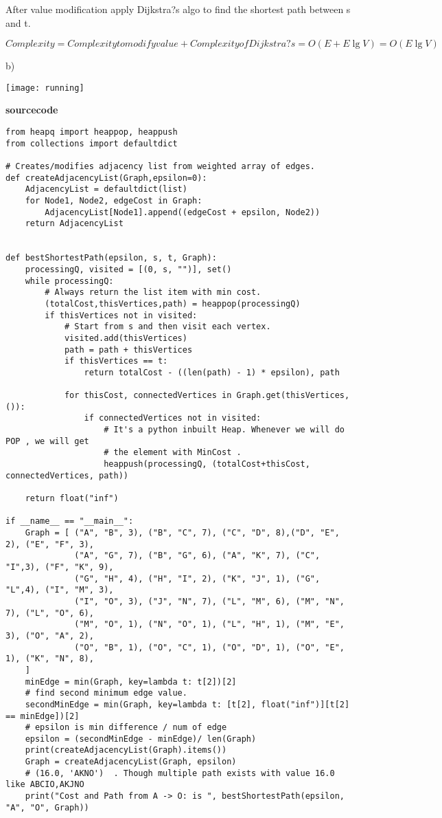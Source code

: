 \documentclass[5pt]{article}
\begin{document}
After value modification apply Dijkstra?s algo to find the shortest path between s and t.

$ Complexity = Complexity to modify value + Complexity of Dijkstra?s = O( E + E \lg V ) = O( E \lg V )$

b) 

\texttt{[image: running]}

\textbf{sourcecode}

\begin{lstlisting}[basicstyle=\tiny]
from heapq import heappop, heappush
from collections import defaultdict

# Creates/modifies adjacency list from weighted array of edges. 
def createAdjacencyList(Graph,epsilon=0):
    AdjacencyList = defaultdict(list)
    for Node1, Node2, edgeCost in Graph:
        AdjacencyList[Node1].append((edgeCost + epsilon, Node2))
    return AdjacencyList


def bestShortestPath(epsilon, s, t, Graph):
    processingQ, visited = [(0, s, "")], set()
    while processingQ:
        # Always return the list item with min cost.
        (totalCost,thisVertices,path) = heappop(processingQ)
        if thisVertices not in visited:
            # Start from s and then visit each vertex.
            visited.add(thisVertices)
            path = path + thisVertices
            if thisVertices == t:
                return totalCost - ((len(path) - 1) * epsilon), path

            for thisCost, connectedVertices in Graph.get(thisVertices, ()):
                if connectedVertices not in visited:
                    # It's a python inbuilt Heap. Whenever we will do POP , we will get 
                    # the element with MinCost .
                    heappush(processingQ, (totalCost+thisCost, connectedVertices, path))

    return float("inf")

if __name__ == "__main__":
    Graph = [ ("A", "B", 3), ("B", "C", 7), ("C", "D", 8),("D", "E", 2), ("E", "F", 3),
              ("A", "G", 7), ("B", "G", 6), ("A", "K", 7), ("C", "I",3), ("F", "K", 9),
              ("G", "H", 4), ("H", "I", 2), ("K", "J", 1), ("G", "L",4), ("I", "M", 3),
              ("I", "O", 3), ("J", "N", 7), ("L", "M", 6), ("M", "N", 7), ("L", "O", 6),
              ("M", "O", 1), ("N", "O", 1), ("L", "H", 1), ("M", "E", 3), ("O", "A", 2),
              ("O", "B", 1), ("O", "C", 1), ("O", "D", 1), ("O", "E", 1), ("K", "N", 8),
    ]
    minEdge = min(Graph, key=lambda t: t[2])[2]
    # find second minimum edge value.
    secondMinEdge = min(Graph, key=lambda t: [t[2], float("inf")][t[2] == minEdge])[2]
    # epsilon is min difference / num of edge
    epsilon = (secondMinEdge - minEdge)/ len(Graph)
    print(createAdjacencyList(Graph).items())
    Graph = createAdjacencyList(Graph, epsilon)
    # (16.0, 'AKNO')  . Though multiple path exists with value 16.0 like ABCIO,AKJNO
    print("Cost and Path from A -> O: is ", bestShortestPath(epsilon, "A", "O", Graph))
\end{lstlisting}
\end{document}
